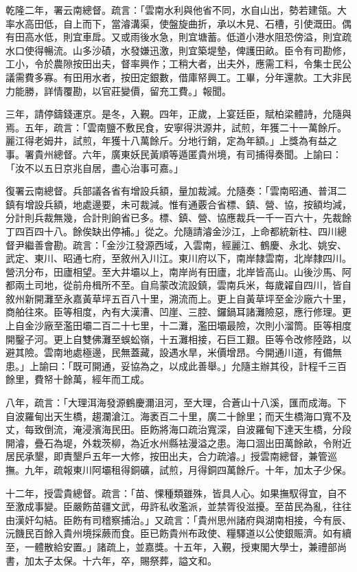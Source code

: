 \begin{pinyinscope}
乾隆二年，署云南總督。疏言：「雲南水利與他省不同，水自山出，勢若建瓴。大率水高田低，自上而下，當濬溝渠，使盤旋曲折，承以木見、石槽，引使溉田。偶有田高水低，則宜車戽。又或雨後水急，則宜塘蓄。低道小港水阻恐傍溢，則宜疏水口使得暢流。山多沙磧，水發嫌迅激，則宜築堤墊，俾護田畝。臣令有司勘修，工小，令於農隙按田出夫，督率興作；工稍大者，出夫外，應需工料，令集士民公議需費多寡。有田用水者，按田定銀數，借庫帑興工。工畢，分年還款。工大非民力能勝，詳情覆勘，以官莊變價，留充工費。」報聞。

三年，請停鑄錢運京。是冬，入覲。四年，正歲，上宴廷臣，賦柏梁體詩，允隨與焉。五年，疏言：「雲南鹽不敷民食，安寧得洪源井，試煎，年獲二十一萬餘斤。麗江得老姆井，試煎，年獲十八萬餘斤。分地行銷，定為年額。」上獎為有益之事。署貴州總督。六年，廣東妖民黃順等遁匿貴州境，有司捕得奏聞。上諭曰：「汝不以五日京兆自居，盡心治事可嘉。」

復署云南總督。兵部議各省有增設兵額，量加裁減。允隨奏：「雲南昭通、普洱二鎮有增設兵額，地處邊要，未可裁減。惟有通覈合省標、鎮、營、協，按額均減，分計則兵裁無幾，合計則餉省已多。標、鎮、營、協應裁兵一千一百六十，先裁餘丁四百四十八。餘俟缺出停補。」從之。允隨請濬金沙江，上命都統新柱、四川總督尹繼善會勘。疏言：「金沙江發源西域，入雲南，經麗江、鶴慶、永北、姚安、武定、東川、昭通七府，至敘州入川江。東川府以下，南岸隸雲南，北岸隸四川。營汛分布，田廬相望。至大井壩以上，南岸尚有田廬，北岸皆高山。山後沙馬、阿都兩土司地，從前舟楫所不至。自烏蒙改流設鎮，雲南兵米，每歲糴自四川，皆自敘州新開灘至永嘉黃草坪五百八十里，溯流而上。更上自黃草坪至金沙廠六十里，商舶往來。臣等相度，內有大漢漕、凹崖、三腔、鑼鍋耳諸灘險惡，應行修理。更上自金沙廠至濫田壩二百二十七里，十二灘，濫田壩最險，次則小溜筒。臣等相度開鑿子河。更上自雙佛灘至蜈蚣嶺，十五灘相接，石巨工艱。臣等令改修陸路，以避其險。雲南地處極邊，民無蓋藏，設遇水旱，米價增昂。今開通川道，有備無患。」上諭曰：「既可開通，妥協為之，以成此善舉。」允隨主辦其役，計程千三百餘里，費帑十餘萬，經年而工成。

八年，疏言：「大理洱海發源鶴慶濔沮河，至大理，合蒼山十八溪，匯而成海。下自波羅甸出天生橋，趨瀾滄江。海袤百二十里，廣二十餘里；而天生橋海口寬不及丈，每致倒流，淹浸濱海民田。臣飭將海口疏治寬深，自波羅甸下達天生橋，分段開濬，疊石為堤，外栽茨柳，為近水州縣袪漫溢之患。海口涸出田萬餘畝，令附近居民承墾，即責墾戶五年一大修，按田出夫，合力疏濬。」授雲南總督，兼管巡撫。九年，疏報東川阿壩租得銅礦，試煎，月得銅四萬餘斤。十年，加太子少保。

十二年，授雲貴總督。疏言：「苗、惈種類雖殊，皆具人心。如果撫馭得宜，自不至激成事變。臣嚴飭苗疆文武，毋許私收濫派，並禁胥役滋擾。至苗民為亂，往往由漢奸勾結。臣飭有司稽察捕治。」又疏言：「貴州思州諸府與湖南相接，今有辰、沅饑民百餘入貴州境採蕨而食。臣已飭貴州布政使、糧驛道以公使銀賑濟。如有續至，一體散給安置。」諸疏上，並嘉獎。十五年，入覲，授東閣大學士，兼禮部尚書，加太子太保。十六年，卒，賜祭葬，謚文和。


\end{pinyinscope}
